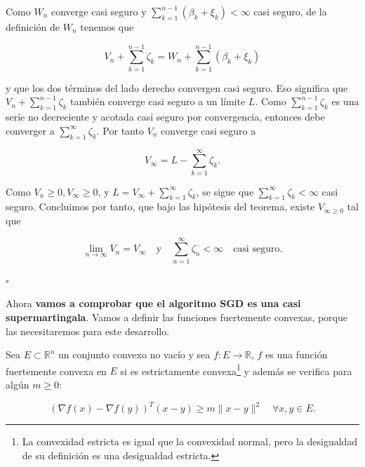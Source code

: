 Como $W_n$ converge casi seguro y $\sum_{k=1}^{n-1} (\beta_k + \xi_k) < \infty$ casi seguro, de la definición de $W_n$ tenemos que 

 

\begin{equation*}
V_n + \sum_{k=1}^{n-1} \zeta_k = W_n + \sum_{k=1}^{n-1} (\beta_k + \xi_k)
\end{equation*}

y que los dos términos del lado derecho convergen casi seguro. Eso significa que $V_n + \sum_{k=1}^{n-1} \zeta_k$ también converge casi seguro a un límite $L$. Como $\sum_{k=1}^{n-1} \zeta_k$ es una serie no decreciente y acotada casi seguro por convergencia, entonces debe converger a $\sum_{k=1}^{\infty} \zeta_k$. Por tanto $V_n$ converge casi seguro a 

\begin{equation*}
	V_\infty = L - \sum_{k=1}^\infty \zeta_k.
\end{equation*}

Como $V_n \geq 0, V_{\infty} \geq0$, y $L= V_{\infty} + \sum_{k=1}^\infty \zeta_k$, se sigue que $\sum_{k=1}^\infty \zeta_k < \infty$ casi seguro. Concluimos por tanto, que bajo las hipótesis del teorema, existe $V_{\infty \geq 0}$ tal que

\begin{equation*}
	\lim_{n \to \infty} V_n = V_\infty \quad \text{y} \quad \sum_{n=1}^\infty \zeta_n < \infty \quad \text{casi seguro}.
\end{equation*}


\begin{flushright}
    $\square$
\end{flushright} 


Ahora \textbf{vamos a comprobar que el algoritmo SGD es una casi supermartingala}. Vamos a definir las funciones fuertemente convexas, porque las necesitaremos para este desarrollo. 

\begin{definicion}
	Sea $E \subset \mathbb{R}^n$ un conjunto convexo no vacío y sea $f:E \rightarrow \mathbb{R}$, $f$ es una función fuertemente convexa en $E$ si es estrictamente convexa\footnote{La convexidad estricta es igual que la convexidad normal, pero la desigualdad de su definición es una desigualdad estricta.} y además se verifica para algún $m \geq 0$:

   	$$( \nabla f(x) - \nabla f(y))^T(x-y) \geq m \|x-y\|^2 \quad  \forall x,y \in E.$$
\end{definicion}

